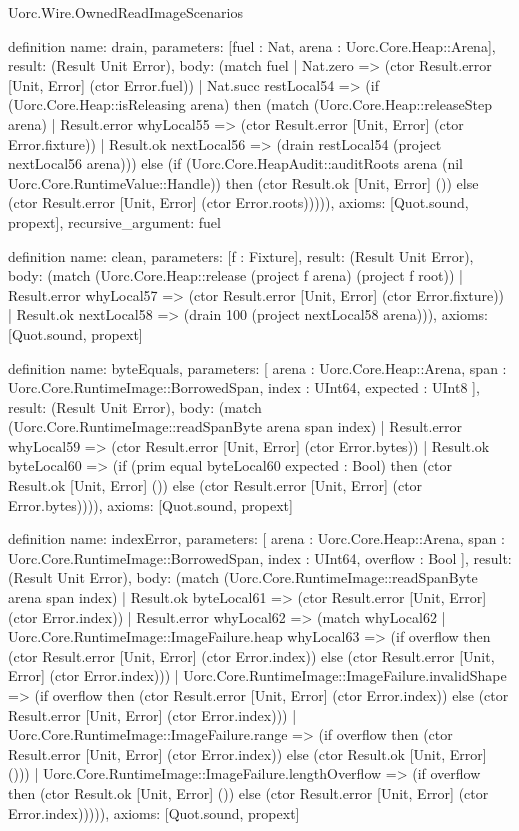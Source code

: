 \begin{lexlean}{Uorc.Wire.OwnedReadImageScenarios}
\begin{semanticmodule}
definition{
  name: drain,
  parameters: [fuel : Nat, arena : Uorc.Core.Heap::Arena],
  result: (Result Unit Error),
  body: (match fuel
    | Nat.zero => (ctor Result.error [Unit, Error] (ctor Error.fuel))
    | Nat.succ restLocal54 => (if (Uorc.Core.Heap::isReleasing arena) then (match (Uorc.Core.Heap::releaseStep arena)
      | Result.error whyLocal55 => (ctor Result.error [Unit, Error] (ctor Error.fixture))
      | Result.ok nextLocal56 => (drain restLocal54 (project nextLocal56 arena))) else (if (Uorc.Core.HeapAudit::auditRoots arena (nil Uorc.Core.RuntimeValue::Handle)) then (ctor Result.ok [Unit, Error] ()) else (ctor Result.error [Unit, Error] (ctor Error.roots))))),
  axioms: [Quot.sound, propext],
  recursive_argument: fuel
}

definition{
  name: clean,
  parameters: [f : Fixture],
  result: (Result Unit Error),
  body: (match (Uorc.Core.Heap::release (project f arena) (project f root))
    | Result.error whyLocal57 => (ctor Result.error [Unit, Error] (ctor Error.fixture))
    | Result.ok nextLocal58 => (drain 100 (project nextLocal58 arena))),
  axioms: [Quot.sound, propext]
}

definition{
  name: byteEquals,
  parameters: [
    arena : Uorc.Core.Heap::Arena,
    span : Uorc.Core.RuntimeImage::BorrowedSpan,
    index : UInt64,
    expected : UInt8
  ],
  result: (Result Unit Error),
  body: (match (Uorc.Core.RuntimeImage::readSpanByte arena span index)
    | Result.error whyLocal59 => (ctor Result.error [Unit, Error] (ctor Error.bytes))
    | Result.ok byteLocal60 => (if (prim equal byteLocal60 expected : Bool) then (ctor Result.ok [Unit, Error] ()) else (ctor Result.error [Unit, Error] (ctor Error.bytes)))),
  axioms: [Quot.sound, propext]
}

definition{
  name: indexError,
  parameters: [
    arena : Uorc.Core.Heap::Arena,
    span : Uorc.Core.RuntimeImage::BorrowedSpan,
    index : UInt64,
    overflow : Bool
  ],
  result: (Result Unit Error),
  body: (match (Uorc.Core.RuntimeImage::readSpanByte arena span index)
    | Result.ok byteLocal61 => (ctor Result.error [Unit, Error] (ctor Error.index))
    | Result.error whyLocal62 => (match whyLocal62
      | Uorc.Core.RuntimeImage::ImageFailure.heap whyLocal63 => (if overflow then (ctor Result.error [Unit, Error] (ctor Error.index)) else (ctor Result.error [Unit, Error] (ctor Error.index)))
      | Uorc.Core.RuntimeImage::ImageFailure.invalidShape => (if overflow then (ctor Result.error [Unit, Error] (ctor Error.index)) else (ctor Result.error [Unit, Error] (ctor Error.index)))
      | Uorc.Core.RuntimeImage::ImageFailure.range => (if overflow then (ctor Result.error [Unit, Error] (ctor Error.index)) else (ctor Result.ok [Unit, Error] ()))
      | Uorc.Core.RuntimeImage::ImageFailure.lengthOverflow => (if overflow then (ctor Result.ok [Unit, Error] ()) else (ctor Result.error [Unit, Error] (ctor Error.index))))),
  axioms: [Quot.sound, propext]
}


\end{semanticmodule}
\end{lexlean}
